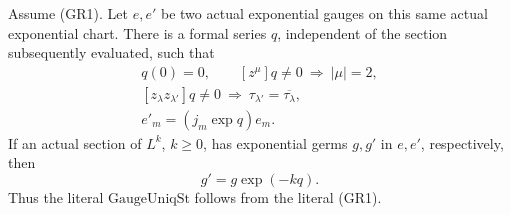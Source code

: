\begin{srproposition}
\label{prop:sr-source-actual-exponential-gauge-ratio}
Assume (GR1).  Let \(e,e'\) be two actual exponential
gauges on this same actual exponential chart.
There is a formal series \(q\), independent of the
section subsequently evaluated, such that
\[
 \begin{gathered}
 q(0)=0,\qquad [z^\mu]q\ne0\ \Longrightarrow\ |\mu|=2,\\
 [z_\lambda z_{\lambda'}]q\ne0
             \ \Longrightarrow\ \tau_{\lambda'}=\overline{\tau_\lambda},\\
                         e'_m=(j_m\exp q)e_m.              \tag{GR5}
 \end{gathered}
\]
If an actual section of \(L^k\), \(k\ge0\), has
exponential germs \(g,g'\) in \(e,e'\), respectively,
then
\[
                              g'=g\exp(-kq).               \tag{GR6}
\]
Thus the literal \(\mathrm{GaugeUniqSt}\) follows from
the literal (GR1).
\end{srproposition}
